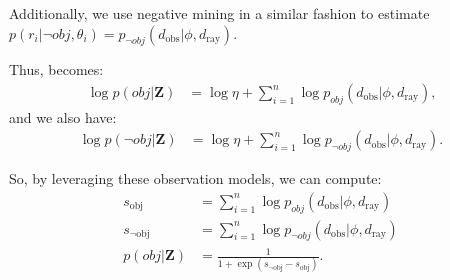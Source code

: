 Additionally, we use negative mining in a similar fashion to estimate
$p( r_i | \lnot obj, \theta_i) = p_{\lnot obj} ( d_{\text{obs}} | \phi, d_{\text{ray}}) $.

Thus,  becomes:
%
\begin{align}
  \log p( obj | \mathbf{Z} ) &=
   \log{\eta} + \sum_{i=1}^{n} { \log p_{obj}( d_{\text{obs}} | \phi, d_{\text{ray}}) }
   \text{,}
   \label{eq:obj_model_pos}
\end{align}
%
and we also have:
%
\begin{align}
  \log p( \lnot obj | \mathbf{Z} ) &=
   \log{\eta} + \sum_{i=1}^{n} { \log p_{\lnot obj} ( d_{\text{obs}} | \phi, d_{\text{ray}}) }
   \text{.}
   \label{eq:obj_model_neg}
\end{align}

So, by leveraging these observation models, we can compute:
%
\begin{align}
  s_{ \text{obj} }     &=
    \sum_{i=1}^{n} { \log p_{obj}( d_{\text{obs}} | \phi, d_{\text{ray}}) } \\
  s_{\lnot \text{obj}} &=
    \sum_{i=1}^{n} { \log p_{\lnot obj} ( d_{\text{obs}} | \phi, d_{\text{ray}}) } \\
  p ( obj | \mathbf{Z} ) &=
    \frac{1}{1 + \exp{(s_{\lnot \text{obj}} - s_{\text{obj}})}}
  \text{.}
  \label{eq:detection_prob}
\end{align}

